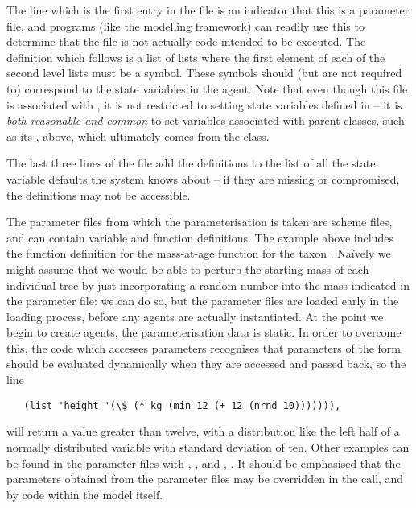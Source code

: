 The  line which is the first entry in the file is
an indicator that this is a parameter file, and \Scheme
programs (like the modelling framework) can readily use this to
determine that the file is not actually code intended to be executed.
The definition which follows is a list of lists where the first
element of each of the second level lists must be a symbol.  These
symbols should (but are not required to) correspond to the state
variables in the agent. Note that even though this file is associated
with , it is not restricted to setting state
variables defined in  -- it is \emph{both reasonable
  and common} to set variables associated with parent classes, such as
its , above, which ultimately comes from the 
class.

The last three lines of the file add the definitions to the list of
all the state variable defaults the system knows about -- if they are
missing or compromised, the definitions may not be accessible.

The parameter files from which the parameterisation is taken are
scheme files, and can contain variable and function definitions.  The
example above includes the function definition for the mass-at-age
function for the taxon .  Na\"ively we might assume
that we would be able to perturb the starting mass of each individual
tree by just incorporating a random number into the mass indicated in
the parameter file: we can do so, but the parameter
files are loaded early in the loading process, before any agents are
actually instantiated.  At the point we begin to create agents,
the parameterisation data is static.  In order to overcome this, the
code which accesses parameters recognises that parameters of the form
\symb{(\$ \ldots )} should be evaluated dynamically when they are
accessed and passed back, so the line

\begin{verbatim}
   (list 'height '(\$ (* kg (min 12 (+ 12 (nrnd 10))))))),
\end{verbatim}

will return a value greater than twelve, with a distribution like the
left half of a normally distributed variable with standard deviation
of ten.  Other examples can be found in the parameter files with
, ,
 and , . 
It should be emphasised that the parameters obtained from the
parameter files may be overridden in the  call, and by
code within the model itself.

